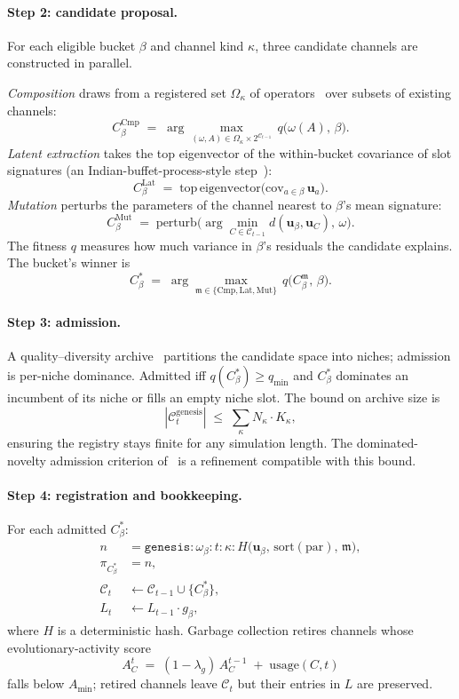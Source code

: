 \documentclass[journal,onecolumn,11pt]{IEEEtran}
\theoremstyle{definition}
\begin{document}
\paragraph{Step 2: candidate proposal.} For each eligible bucket $\beta$ and channel kind $\kappa$, three candidate channels are constructed in parallel.

\emph{Composition} draws from a registered set $\Omega_\kappa$ of operators~\cite{arthur2009,lake2015} over subsets of existing channels:
\[
C_\beta^{\mathrm{Cmp}} \;=\; \arg\max_{(\omega, A) \in \Omega_\kappa \times 2^{\mathcal{C}_{t-1}}}\, q\bigl(\omega(A),\, \beta\bigr).
\]
\emph{Latent extraction} takes the top eigenvector of the within-bucket covariance of slot signatures (an Indian-buffet-process-style step~\cite{griffiths2011}):
\[
C_\beta^{\mathrm{Lat}} \;=\; \mathrm{top\,eigenvector}\!\bigl(\mathrm{cov}_{a \in \beta}\, \mathbf{u}_a\bigr).
\]
\emph{Mutation} perturbs the parameters of the channel nearest to $\beta$'s mean signature:
\[
C_\beta^{\mathrm{Mut}} \;=\; \mathrm{perturb}\!\bigl(\arg\min_{C \in \mathcal{C}_{t-1}} d(\mathbf{u}_\beta, \mathbf{u}_C),\, \omega\bigr).
\]
The fitness $q$ measures how much variance in $\beta$'s residuals the candidate explains. The bucket's winner is
\[
C_\beta^* \;=\; \arg\max_{\mathfrak{m} \in \{\mathrm{Cmp},\mathrm{Lat},\mathrm{Mut}\}}\, q\bigl(C_\beta^\mathfrak{m},\, \beta\bigr).
\]

\paragraph{Step 3: admission.} A quality--diversity archive~\cite{lehman2011,mouret2015} partitions the candidate space into niches; admission is per-niche dominance. Admitted iff $q(C_\beta^*) \ge q_{\min}$ and $C_\beta^*$ dominates an incumbent of its niche or fills an empty niche slot. The bound on archive size is
\[
|\mathcal{C}_t^{\mathrm{genesis}}| \;\le\; \sum_\kappa N_\kappa \cdot K_\kappa,
\]
ensuring the registry stays finite for any simulation length. The dominated-novelty admission criterion of~\cite{lim2025} is a refinement compatible with this bound.

\paragraph{Step 4: registration and bookkeeping.} For each admitted $C_\beta^*$:
\begin{align*}
n &= \mathtt{genesis}\!:\!\omega_\beta\!:\!t\!:\!\kappa\!:\!H\!\bigl(\mathbf{u}_\beta,\, \mathrm{sort}(\mathrm{par}),\, \mathfrak{m}\bigr),\\
\pi_{C_\beta^*} &= n,\\
\mathcal{C}_t &\leftarrow \mathcal{C}_{t-1} \cup \{C_\beta^*\},\\
L_t &\leftarrow L_{t-1} \cdot g_\beta,
\end{align*}
where $H$ is a deterministic hash. Garbage collection retires channels whose evolutionary-activity score~\cite{bedau1998}
\[
A_C^t \;=\; (1 - \lambda_g)\, A_C^{t-1} \;+\; \mathrm{usage}(C, t)
\]
falls below $A_{\min}$; retired channels leave $\mathcal{C}_t$ but their entries in $L$ are preserved.
\end{document}
